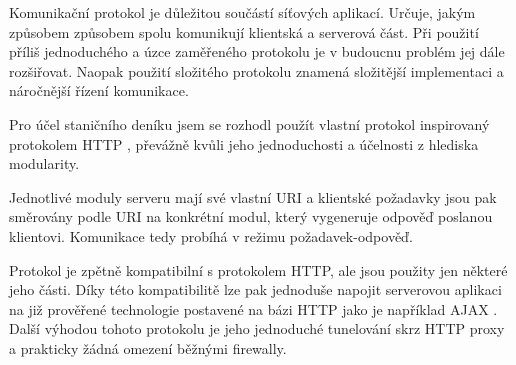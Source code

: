
Komunikační protokol je důležitou součástí síťových aplikací. Určuje, jakým způsobem způsobem spolu komunikují
klientská a serverová část. Při použití příliš jednoduchého a úzce zaměřeného protokolu je v budoucnu problém
jej dále rozšiřovat. Naopak použití složitého protokolu znamená složitější implementaci a náročnější řízení komunikace.

Pro účel staničního deníku jsem se rozhodl použít vlastní protokol inspirovaný protokolem HTTP \cite{http},
převážně kvůli jeho jednoduchosti a účelnosti z hlediska modularity.

Jednotlivé moduly serveru mají své vlastní URI a klientské požadavky jsou pak směrovány podle URI na konkrétní modul,
který vygeneruje odpověď poslanou klientovi. Komunikace tedy probíhá v režimu požadavek-odpověď.

Protokol je zpětně kompatibilní s protokolem HTTP, ale jsou použity jen některé jeho části. Díky této kompatibilitě
lze pak jednoduše napojit serverovou aplikaci na již prověřené technologie postavené na bázi HTTP jako je například
AJAX \cite{ajax}. Další výhodou tohoto protokolu je jeho jednoduché tunelování skrz HTTP proxy a prakticky žádná
omezení běžnými firewally.


